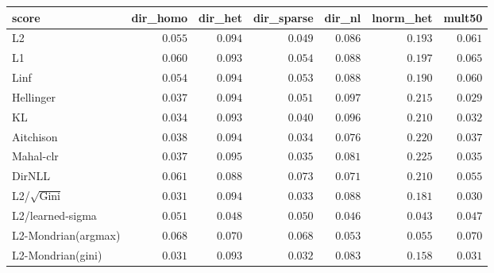 \begin{tabular}{lrrrrrr}
\toprule
score & dir\_homo & dir\_het & dir\_sparse & dir\_nl & lnorm\_het & mult50 \\
\midrule
L2 & $0.055$ & $0.094$ & $0.049$ & $0.086$ & $0.193$ & $0.061$ \\
L1 & $0.060$ & $0.093$ & $0.054$ & $0.088$ & $0.197$ & $0.065$ \\
Linf & $0.054$ & $0.094$ & $0.053$ & $0.088$ & $0.190$ & $0.060$ \\
Hellinger & $0.037$ & $0.094$ & $0.051$ & $0.097$ & $0.215$ & $\mathbf{0.029}$ \\
KL & $0.034$ & $0.093$ & $0.040$ & $0.096$ & $0.210$ & $0.032$ \\
Aitchison & $0.038$ & $0.094$ & $0.034$ & $0.076$ & $0.220$ & $0.037$ \\
Mahal-clr & $0.037$ & $0.095$ & $0.035$ & $0.081$ & $0.225$ & $0.035$ \\
DirNLL & $0.061$ & $0.088$ & $0.073$ & $0.071$ & $0.210$ & $0.055$ \\
L2/$\sqrt{\mathrm{Gini}}$ & $0.031$ & $0.094$ & $0.033$ & $0.088$ & $0.181$ & $0.030$ \\
L2/learned-sigma & $0.051$ & $\mathbf{0.048}$ & $0.050$ & $\mathbf{0.046}$ & $\mathbf{0.043}$ & $0.047$ \\
L2-Mondrian(argmax) & $0.068$ & $0.070$ & $0.068$ & $0.053$ & $0.055$ & $0.070$ \\
L2-Mondrian(gini) & $\mathbf{0.031}$ & $0.093$ & $\mathbf{0.032}$ & $0.083$ & $0.158$ & $0.031$ \\
\bottomrule
\end{tabular}